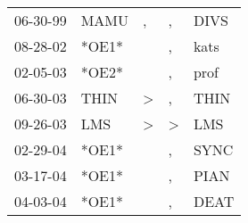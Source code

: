 \begin{supertabular}{lllll}
 06-30-99 &   MAMU &             , &             , &  DIVS \\
 08-28-02 &  *OE1* &               &             , &  kats \\
 02-05-03 &  *OE2* &               &             , &  prof \\
 06-30-03 &   THIN &  \textgreater &             , &  THIN \\
 09-26-03 &    LMS &  \textgreater &  \textgreater &   LMS \\
 02-29-04 &  *OE1* &               &             , &  SYNC \\
 03-17-04 &  *OE1* &               &             , &  PIAN \\
 04-03-04 &  *OE1* &               &             , &  DEAT \\
\end{supertabular}
